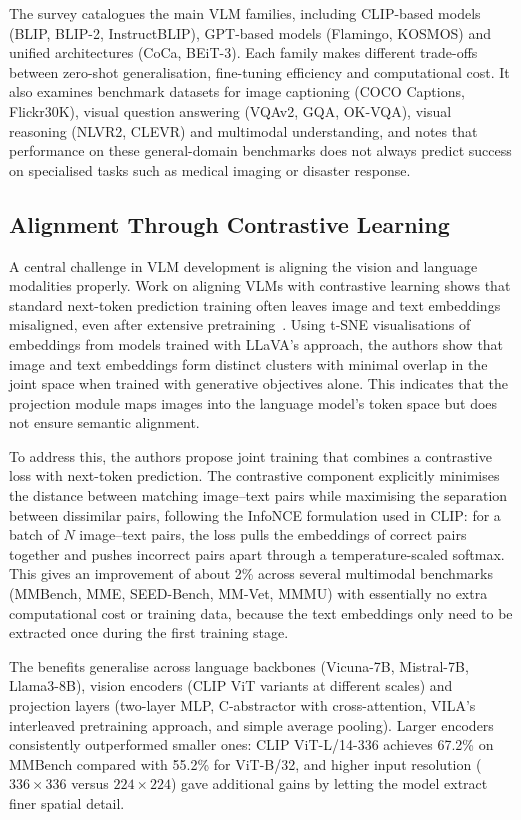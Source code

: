 \documentclass[12pt]{report}
\begin{document}
The survey catalogues the main VLM families, including CLIP-based models (BLIP, BLIP-2, InstructBLIP), GPT-based models (Flamingo, KOSMOS) and unified architectures (CoCa, BEiT-3). Each family makes different trade-offs between zero-shot generalisation, fine-tuning efficiency and computational cost. It also examines benchmark datasets for image captioning (COCO Captions, Flickr30K), visual question answering (VQAv2, GQA, OK-VQA), visual reasoning (NLVR2, CLEVR) and multimodal understanding, and notes that performance on these general-domain benchmarks does not always predict success on specialised tasks such as medical imaging or disaster response.

\subsection{Alignment Through Contrastive Learning}
A central challenge in VLM development is aligning the vision and language modalities properly. Work on aligning VLMs with contrastive learning shows that standard next-token prediction training often leaves image and text embeddings misaligned, even after extensive pretraining~\cite{ak2024aligning}. Using t-SNE visualisations of embeddings from models trained with LLaVA's approach, the authors show that image and text embeddings form distinct clusters with minimal overlap in the joint space when trained with generative objectives alone. This indicates that the projection module maps images into the language model's token space but does not ensure semantic alignment.

To address this, the authors propose joint training that combines a contrastive loss with next-token prediction. The contrastive component explicitly minimises the distance between matching image--text pairs while maximising the separation between dissimilar pairs, following the InfoNCE formulation used in CLIP: for a batch of $N$ image--text pairs, the loss pulls the embeddings of correct pairs together and pushes incorrect pairs apart through a temperature-scaled softmax. This gives an improvement of about 2\% across several multimodal benchmarks (MMBench, MME, SEED-Bench, MM-Vet, MMMU) with essentially no extra computational cost or training data, because the text embeddings only need to be extracted once during the first training stage.

The benefits generalise across language backbones (Vicuna-7B, Mistral-7B, Llama3-8B), vision encoders (CLIP ViT variants at different scales) and projection layers (two-layer MLP, C-abstractor with cross-attention, VILA's interleaved pretraining approach, and simple average pooling). Larger encoders consistently outperformed smaller ones: CLIP ViT-L/14-336 achieves 67.2\% on MMBench compared with 55.2\% for ViT-B/32, and higher input resolution ($336\times336$ versus $224\times224$) gave additional gains by letting the model extract finer spatial detail.
\end{document}
